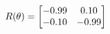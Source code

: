 \documentclass[preview]{standalone}
\begin{document}
\begin{align*}
\special{dvisvgm:raw <g id='unique000'>}R(\theta) = \begin{bmatrix}-0.99 & 0.10\\-0.10 & -0.99\end{bmatrix}\special{dvisvgm:raw </g>}
\end{align*}
\end{document}
